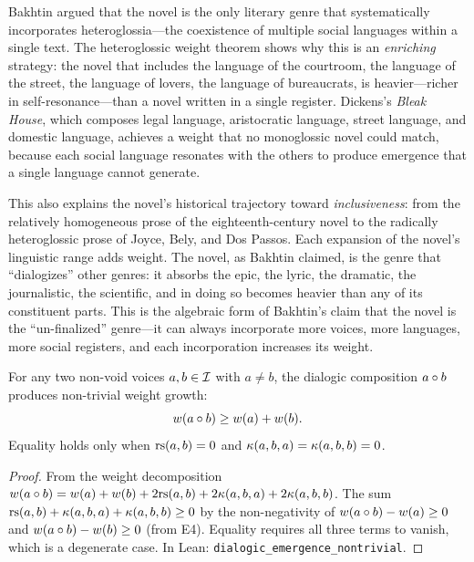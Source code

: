 \begin{interpretation}
\label{interp:novel-heteroglossia}
Bakhtin argued that the novel is the only literary genre that systematically incorporates heteroglossia---the coexistence of multiple social languages within a single text.  The heteroglossic weight theorem shows why this is an \emph{enriching} strategy: the novel that includes the language of the courtroom, the language of the street, the language of lovers, the language of bureaucrats, is heavier---richer in self-resonance---than a novel written in a single register.  Dickens's \textit{Bleak House}, which composes legal language, aristocratic language, street language, and domestic language, achieves a weight that no monoglossic novel could match, because each social language resonates with the others to produce emergence that a single language cannot generate.

This also explains the novel's historical trajectory toward \emph{inclusiveness}: from the relatively homogeneous prose of the eighteenth-century novel to the radically heteroglossic prose of Joyce, Bely, and Dos Passos.  Each expansion of the novel's linguistic range adds weight.  The novel, as Bakhtin claimed, is the genre that ``dialogizes'' other genres: it absorbs the epic, the lyric, the dramatic, the journalistic, the scientific, and in doing so becomes heavier than any of its constituent parts.  This is the algebraic form of Bakhtin's claim that the novel is the ``un-finalized'' genre---it can always incorporate more voices, more languages, more social registers, and each incorporation increases its weight.
\end{interpretation}

\begin{theorem}
\label{thm:dialogic-emergence}
For any two non-void voices $a, b \in \mathcal{I}$ with $a \neq b$, the dialogic composition $a \circ b$ produces non-trivial weight growth:
\[
  w(a \circ b) \geq w(a) + w(b).
\]
Equality holds only when $\mathrm{rs}(a, b) = 0$ and $\kappa(a, b, a) = \kappa(a, b, b) = 0$.
\end{theorem}

\begin{proof}
From the weight decomposition $w(a \circ b) = w(a) + w(b) + 2\mathrm{rs}(a, b) + 2\kappa(a, b, a) + 2\kappa(a, b, b)$.  The sum $\mathrm{rs}(a, b) + \kappa(a, b, a) + \kappa(a, b, b) \geq 0$ by the non-negativity of $w(a \circ b) - w(a) \geq 0$ and $w(a \circ b) - w(b) \geq 0$ (from E4).  Equality requires all three terms to vanish, which is a degenerate case.  In Lean: \texttt{dialogic\_emergence\_nontrivial}.
\end{proof}

